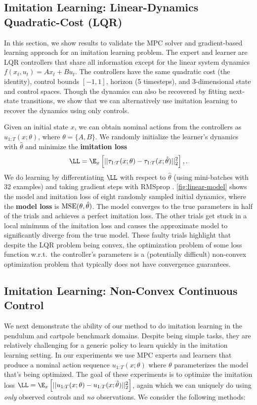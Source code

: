 \subsection{Imitation Learning: Linear-Dynamics Quadratic-Cost (LQR)}

In this section, we show results to validate the MPC solver and
gradient-based learning approach for an imitation learning problem.
The expert and learner are LQR controllers that share all information
except for the linear system dynamics $f(x_t, u_t) = Ax_t + Bu_t$.
The controllers have the same quadratic cost (the identity),
control bounds $[-1, 1]$, horizon (5 timesteps),
and 3-dimensional state and control spaces.
Though the dynamics can also be recovered by
fitting next-state transitions, we show that we can
alternatively use imitation learning to
recover the dynamics using only controls.

Given an initial state $x$, we can obtain nominal actions from the
controllers as $u_{1:T}(x; \theta)$, where $\theta=\{A, B\}$.
We randomly initialize the learner's dynamics with $\hat \theta$ and
minimize the \textbf{imitation loss}
$$\LL = \E_x\left[ ||\tau_{1:T}(x; \theta) - \tau_{1:T}(x; \hat\theta)||_2^2\right],.$$
We do learning by differentiating $\LL$ with
respect to $\hat \theta$ (using mini-batches with 32 examples) and
taking gradient steps with RMSprop \citep{tieleman2012lecture}.
\cref{fig:linear-model} shows the model and imitation loss of
eight randomly sampled initial dynamics,
where the \textbf{model loss} is ${\rm MSE}(\theta, \hat\theta)$.
The model converges to the true parameters in half of the trials
and achieves a perfect imitation loss.
The other trials get stuck in a local minimum of the
imitation loss and causes the approximate model to significantly
diverge from the true model.
These faulty trials highlight that despite the LQR problem
being convex, the optimization problem of some loss function
w.r.t.~the controller's parameters is a (potentially difficult)
non-convex optimization problem that typically does not have
convergence guarantees.

\subsection{Imitation Learning: Non-Convex Continuous Control}
\label{il:ctrl}
We next demonstrate the ability of our method to do imitation
learning in the pendulum and cartpole benchmark domains.
Despite being simple tasks, they are relatively challenging for a
generic policy to learn quickly in the imitation learning setting.
In our experiments we use MPC experts and learners
that produce a nominal action sequence
$u_{1:T}(x; \theta)$ where $\theta$ parameterizes the
model that's being optimized.
The goal of these experiments is to optimize the imitation loss
$\LL = \E_x\left[ ||u_{1:T}(x; \theta) - u_{1:T}(x; \hat\theta)||_2^2\right]$,
again which we can uniquely do using \emph{only} observed controls and
\emph{no} observations.
We consider the following methods:

